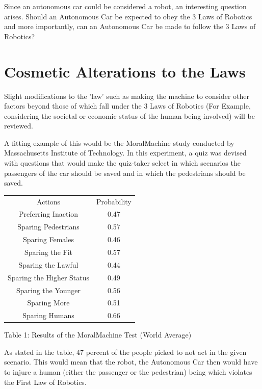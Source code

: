 \documentclass{article}
\begin{document}
Since an autonomous car could be considered a robot, an interesting question arises. Should an Autonomous Car be expected to obey the 3 Laws of Robotics and more importantly, can an Autonomous Car be made to follow the 3 Laws of Robotics?  

\section{Cosmetic Alterations to the Laws}
Slight modifications to the 'law' such as making the machine to consider other factors beyond those of which fall under the 3 Laws of Robotics (For Example, considering the societal or economic status of the human being involved) will be reviewed.

A fitting example of this would be the MoralMachine study conducted by Massachusetts Institute of Technology. In this experiment, a quiz was devised with questions that would make the quiz-taker select in which scenarios the passengers of the car should be saved and in which the pedestrians should be saved.


\begin{center}
    \begin{tabular}{|c|c|}
    
    \hline
    Actions & Probability \\
    Preferring Inaction & 0.47 \\
    Sparing Pedestrians & 0.57 \\
    Sparing Females & 0.46 \\
    Sparing the Fit & 0.57 \\
    Sparing the Lawful & 0.44 \\
    Sparing the Higher Status & 0.49 \\
    Sparing the Younger & 0.56 \\
    Sparing More & 0.51 \\
    Sparing Humans & 0.66 \\
    \hline
    \end{tabular}
\end{center}

\begin{center}
Table 1: Results of the MoralMachine Test (World Average)    
\end{center}


As stated in the table, 47 percent of the people picked to not act in the given scenario. This would mean that the robot, the Autonomous Car then would have to injure a human (either the passenger or the pedestrian) being which violates the First Law of Robotics.
\end{document}
